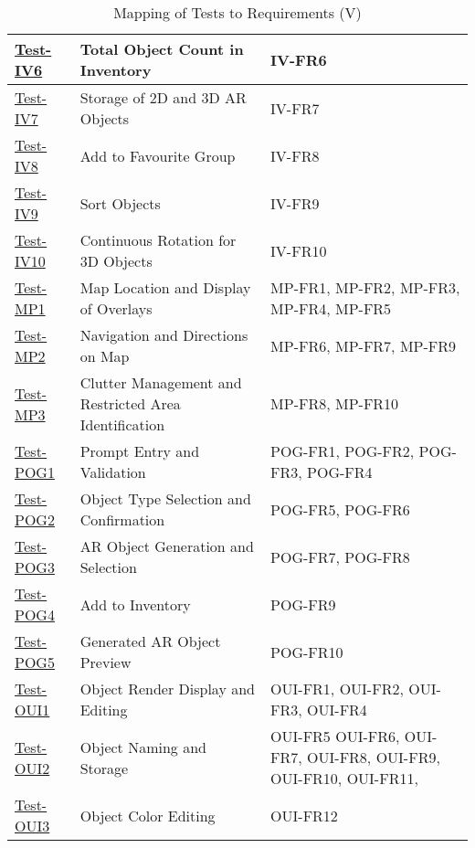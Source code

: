 \documentclass[12pt, titlepage]{article}
\begin{document}
\begin{table}[htpb!]
    \centering
    \begin{tabular}{|l|p{8cm}|p{3cm}|}
        \hline
        \hyperref[itm:Test-IV6]{Test-IV6} & Total Object Count in Inventory & IV-FR6 \\
        \hline
        \hyperref[itm:Test-IV7]{Test-IV7} & Storage of 2D and 3D AR Objects & IV-FR7 \\
        \hline
        \hyperref[itm:Test-IV8]{Test-IV8} & Add to Favourite Group & IV-FR8 \\
        \hline
        \hyperref[itm:Test-IV9]{Test-IV9} & Sort Objects & IV-FR9 \\
        \hline
        \hyperref[itm:Test-IV10]{Test-IV10} & Continuous Rotation for 3D Objects & IV-FR10 \\
        \hline
        \hyperref[itm:Test-MP1]{Test-MP1} & Map Location and Display of Overlays & MP-FR1, MP-FR2, MP-FR3, MP-FR4, MP-FR5 \\
        \hline
        \hyperref[itm:Test-MP2]{Test-MP2} & Navigation and Directions on Map & MP-FR6, MP-FR7, MP-FR9 \\
        \hline
        \hyperref[itm:Test-MP3]{Test-MP3} & Clutter Management and Restricted Area Identification & MP-FR8, MP-FR10 \\
        \hline
        \hyperref[itm:Test-POG1]{Test-POG1} & Prompt Entry and Validation & POG-FR1, POG-FR2, POG-FR3, POG-FR4 \\
        \hline
        \hyperref[itm:Test-POG2]{Test-POG2} & Object Type Selection and Confirmation & POG-FR5, POG-FR6 \\
        \hline
        \hyperref[itm:Test-POG3]{Test-POG3} & AR Object Generation and Selection & POG-FR7, POG-FR8 \\
        \hline
        \hyperref[itm:Test-POG4]{Test-POG4} & Add to Inventory & POG-FR9 \\
        \hline
        \hyperref[itm:Test-POG5]{Test-POG5} & Generated AR Object Preview & POG-FR10 \\
        \hline
        \hyperref[itm:Test-OUI1]{Test-OUI1} & Object Render Display and Editing & OUI-FR1, OUI-FR2, OUI-FR3, OUI-FR4 \\
        \hline
        \hyperref[itm:Test-OUI2]{Test-OUI2} & Object Naming and Storage & OUI-FR5 OUI-FR6, OUI-FR7, OUI-FR8, OUI-FR9, OUI-FR10, OUI-FR11, \\
        \hline
        \hyperref[itm:Test-OUI3]{Test-OUI3} & Object Color Editing & OUI-FR12 \\
        \hline
    \end{tabular}
    \caption{Mapping of Tests to Requirements (V)}
    \label{tab:test_requirements5}
\end{table}
\end{document}
